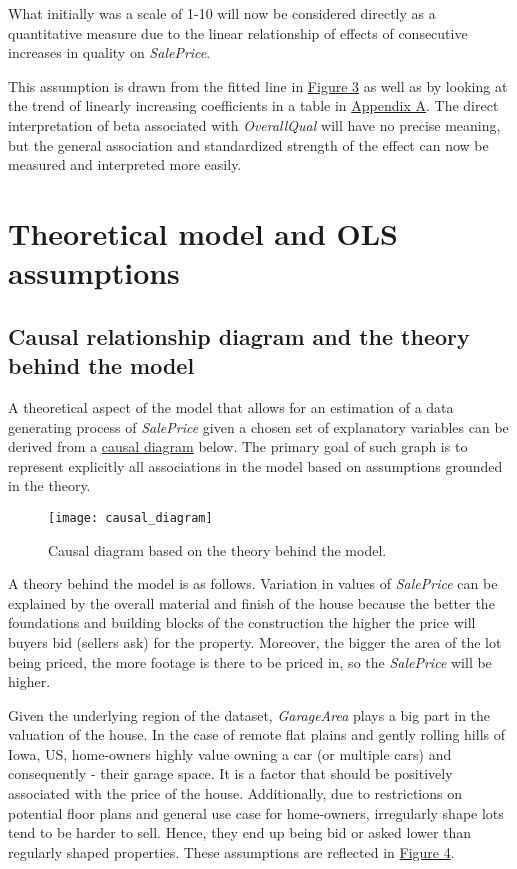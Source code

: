 \documentclass{article}
\begin{document}
What initially was a scale of 1-10 will now be considered directly as a quantitative measure due to the linear relationship of effects of consecutive increases in quality on \emph{SalePrice}. 

This assumption is drawn from the fitted line in \hyperref[fig:scatterBaseQualityLinear]{Figure 3} as well as by looking at the trend of linearly increasing coefficients in a table in \hyperref[tab:overallqualldummy]{Appendix A}. The direct interpretation of beta associated with \emph{OverallQual} will have no precise meaning, but the general association and standardized strength of the effect can now be measured and interpreted more easily. 

\section{Theoretical model and OLS assumptions}
\label{sec:theory}

\subsection{Causal relationship diagram and the theory behind the model}

A theoretical aspect of the model that allows for an estimation of a data generating process of \emph{SalePrice} given a chosen set of explanatory variables can be derived from a \hyperref[fig:causaldiagram]{causal diagram} below. The primary goal of such graph is to represent
explicitly all associations in the model based on assumptions grounded in the theory. 

\begin{figure}[htp]
    \caption{Causal diagram based on the theory behind the model.}
    \centering
    \texttt{[image: causal\_diagram]}
    \label{fig:causaldiagram}
\end{figure}

A theory behind the model is as follows. Variation in values of \emph{SalePrice} can be explained by the overall material and finish of the house because the better the foundations and building blocks of the construction the higher the price will buyers bid (sellers ask) for the property. Moreover, the bigger the area of the lot being priced, the more footage is there to be priced in, so the \emph{SalePrice} will be higher. 

Given the underlying region of the dataset, \emph{GarageArea} plays a big part in the valuation of the house. In the case of remote flat plains and gently rolling hills of Iowa, US, home-owners highly value owning a car (or multiple cars) and consequently - their garage space. It is a factor that should be positively associated with the price of the house. Additionally, due to restrictions on potential floor plans and general use case for home-owners, irregularly shape lots tend to be harder to sell. Hence, they end up being bid or asked lower than regularly shaped properties. These assumptions are reflected in \hyperref[fig:causaldiagram]{Figure 4}.
\end{document}
